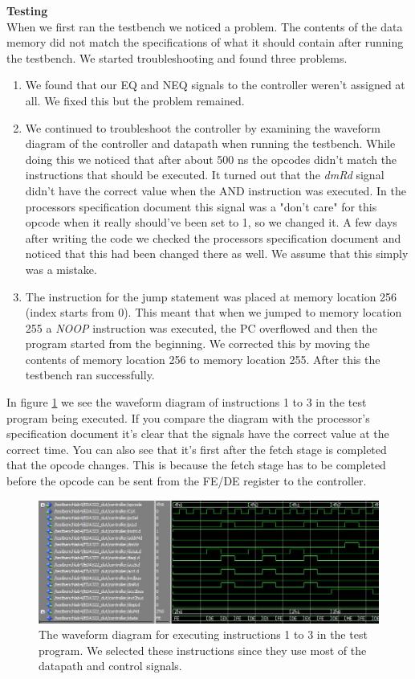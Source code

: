 \documentclass[a4paper,11pt]{article}
\begin{document}
\textbf{Testing} \\
When we first ran the testbench we noticed a problem. The contents of the data memory did not match the specifications of what it should contain after running the testbench. We started troubleshooting and found three problems.

\begin{enumerate}
  \item We found that our EQ and NEQ signals to the controller weren't assigned at all. We fixed this but the problem remained.
  \item We continued to troubleshoot the controller by examining the waveform diagram of the controller and datapath when running the testbench. While doing this we noticed that after about 500 ns the opcodes didn't match the instructions that should be executed. It turned out that the \textit{dmRd} signal didn't have the correct value when the AND instruction was executed. In the processors specification document this signal was a "don't care" for this opcode when it really should've been set to 1, so we changed it. A few days after writing the code we checked the processors specification document and noticed that this had been changed there as well. We assume that this simply was a mistake. 
  \item The instruction for the jump statement was placed at memory location 256 (index starts from 0). This meant that when we jumped to memory location 255 a \textit{NOOP} instruction was executed, the PC overflowed and then the program started from the beginning. We corrected this by moving the contents of memory location 256 to memory location 255. After this the testbench ran successfully.  
\end{enumerate}

In figure \ref{fig:waves_instr} we see the waveform diagram of instructions 1 to 3 in the test program being executed. If you compare the diagram with the processor's specification document it's clear that the signals have the correct value at the correct time. You can also see that it's first after the fetch stage is completed that the opcode changes. This is because the fetch stage has to be completed before the opcode can be sent from the FE/DE register to the controller. 

 \begin{figure}[h!]
  \centering
  \includegraphics[width=0.72\linewidth]{controller_waves.JPG}
  \caption{The waveform diagram for executing instructions 1 to 3 in the test program. We selected these instructions since they use most of the datapath and control signals.}
  \label{fig:waves_instr}
\end{figure}
\end{document}
